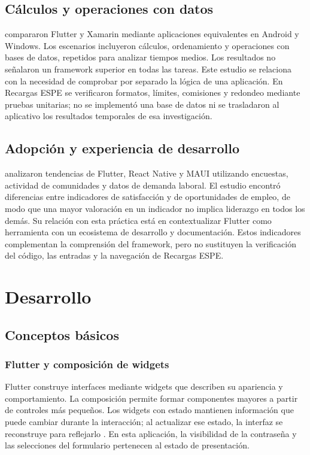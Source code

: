\documentclass[12pt,letterpaper]{article}
\begin{document}
\subsection{Cálculos y operaciones con datos}
\citet{ucinski2022} compararon Flutter y Xamarin mediante aplicaciones equivalentes en Android y Windows. Los escenarios incluyeron cálculos, ordenamiento y operaciones con bases de datos, repetidos para analizar tiempos medios. Los resultados no señalaron un framework superior en todas las tareas. Este estudio se relaciona con la necesidad de comprobar por separado la lógica de una aplicación. En Recargas ESPE se verificaron formatos, límites, comisiones y redondeo mediante pruebas unitarias; no se implementó una base de datos ni se trasladaron al aplicativo los resultados temporales de esa investigación.

\subsection{Adopción y experiencia de desarrollo}
\citet{jost2025} analizaron tendencias de Flutter, React Native y MAUI utilizando encuestas, actividad de comunidades y datos de demanda laboral. El estudio encontró diferencias entre indicadores de satisfacción y de oportunidades de empleo, de modo que una mayor valoración en un indicador no implica liderazgo en todos los demás. Su relación con esta práctica está en contextualizar Flutter como herramienta con un ecosistema de desarrollo y documentación. Estos indicadores complementan la comprensión del framework, pero no sustituyen la verificación del código, las entradas y la navegación de Recargas ESPE.

\section{Desarrollo}
\subsection{Conceptos básicos}
\subsubsection{Flutter y composición de widgets}
Flutter construye interfaces mediante widgets que describen su apariencia y comportamiento. La composición permite formar componentes mayores a partir de controles más pequeños. Los widgets con estado mantienen información que puede cambiar durante la interacción; al actualizar ese estado, la interfaz se reconstruye para reflejarlo \citep{flutterarquitectura}. En esta aplicación, la visibilidad de la contraseña y las selecciones del formulario pertenecen al estado de presentación.
\end{document}
